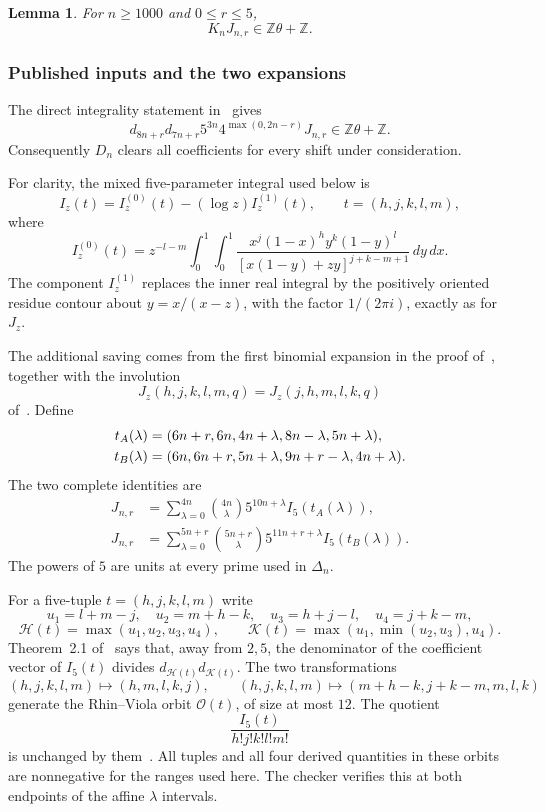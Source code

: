 \documentclass[11pt]{amsart}
\newcommand{\Z}{\mathbb Z}
\newcommand{\dd}{\,d}
\theoremstyle{plain}
\newtheorem{lemma}[theorem]{Lemma}
\theoremstyle{remark}\newtheorem{remark}[theorem]{Remark}
\numberwithin{equation}{section}
\begin{document}
\begin{lemma}\label{f:lem:arith}
For $n\geq1000$ and $0\leq r\leq5$,
\[
 K_nJ_{n,r}\in\Z\theta+\Z.
\]
\end{lemma}

\subsubsection{Published inputs and the two expansions}
The direct integrality statement in~\cite[Lemma 2.1]{VZ18} gives
\[
 d_{8n+r}d_{7n+r}5^{3n}4^{\max(0,2n-r)}J_{n,r}\in\Z\theta+\Z.
\]
Consequently $D_n$ clears all coefficients for every shift under consideration.

For clarity, the mixed five-parameter integral used below is
\[
 I_z(t)=I_z^{(0)}(t)-(\log z)I_z^{(1)}(t),\qquad t=(h,j,k,l,m),
\]
where
\begin{equation}\label{f:eq:RV-definition}
 I_z^{(0)}(t)=z^{-l-m}\int_0^1\!\int_0^1
 \frac{x^j(1-x)^h y^k(1-y)^l}
 {[x(1-y)+zy]^{j+k-m+1}}\dd y\dd x.
\end{equation}
The component $I_z^{(1)}$ replaces the inner real integral by the
positively oriented residue contour about $y=x/(x-z)$, with the
factor $1/(2\pi i)$, exactly as for $J_z$.

The additional saving comes from the first binomial expansion in the
proof of~\cite[Lemma 2.1]{VZ18}, together with the involution
\[
 J_z(h,j,k,l,m,q)=J_z(j,h,m,l,k,q)
\]
of~\cite[Lemma 3.1]{VZ18}. Define
\begin{align}
 t_A(\lambda)&=(6n+r,6n,4n+\lambda,8n-\lambda,5n+\lambda),\notag\\
 t_B(\lambda)&=(6n,6n+r,5n+\lambda,9n+r-\lambda,4n+\lambda).
 \label{f:eq:expansion-tuples}
\end{align}
The two complete identities are
\begin{align}
 J_{n,r}&=\sum_{\lambda=0}^{4n}\binom{4n}{\lambda}
     5^{10n+\lambda} I_5(t_A(\lambda)),\label{f:eq:expansion-A}\\
 J_{n,r}&=\sum_{\lambda=0}^{5n+r}\binom{5n+r}{\lambda}
     5^{11n+r+\lambda} I_5(t_B(\lambda)).\label{f:eq:expansion-B}
\end{align}
The powers of $5$ are units at every prime used in $\Delta_n$.

For a five-tuple $t=(h,j,k,l,m)$ write
\[
 u_1=l+m-j,\quad u_2=m+h-k,\quad u_3=h+j-l,\quad u_4=j+k-m,
\]
\[
 \mathcal H(t)=\max(u_1,u_2,u_3,u_4),\qquad
 \mathcal K(t)=\max(u_1,\min(u_2,u_3),u_4).
\]
Theorem~2.1 of~\cite{RV05} says that, away from $2,5$, the denominator of the coefficient vector of $I_5(t)$ divides $d_{\mathcal H(t)}d_{\mathcal K(t)}$.
The two transformations
\[
 (h,j,k,l,m)\mapsto(h,m,l,k,j),\qquad
 (h,j,k,l,m)\mapsto(m+h-k,j+k-m,m,l,k)
\]
generate the Rhin--Viola orbit $\mathcal O(t)$, of size at most $12$. The quotient
\[
 \frac{I_5(t)}{h!j!k!l!m!}
\]
is unchanged by them~\cite[Section 3]{RV05}. All tuples and all four derived quantities in these orbits are nonnegative for the ranges used here. The checker verifies this at both endpoints of the affine $\lambda$ intervals.
\end{document}
